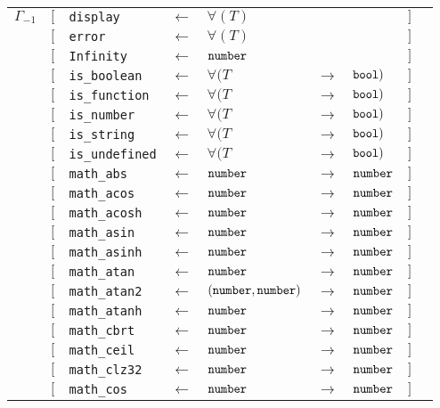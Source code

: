 \begin{tabular}[fragile]{lllllllll}
$\Gamma_{-1}$
& $[$ & \texttt{display}      & $\leftarrow$  & $\forall(T)$ & & & $]$ \\
& $[$ & \texttt{error}      & $\leftarrow$  & $\forall(T)$ & & & $]$ \\
& $[$ & \texttt{Infinity}      & $\leftarrow$  & $\texttt{number}$ & & & $]$ \\
& $[$ & \texttt{is\_boolean}      & $\leftarrow$  & $\forall(T$ & $\rightarrow$ & $\texttt{bool})$ & $]$ \\
& $[$ & \texttt{is\_function} & $\leftarrow$  & $\forall(T$ & $\rightarrow$ & $\texttt{bool})$ & $]$ \\
& $[$ & \texttt{is\_number} & $\leftarrow$  & $\forall(T$ & $\rightarrow$ & $\texttt{bool})$ & $]$ \\
& $[$ & \texttt{is\_string} & $\leftarrow$  & $\forall(T$ & $\rightarrow$ & $\texttt{bool})$ & $]$ \\
& $[$ & \texttt{is\_undefined} & $\leftarrow$  & $\forall(T$ & $\rightarrow$ & $\texttt{bool})$ & $]$ \\
& $[$ & \texttt{math\_abs} & $\leftarrow$  & $\texttt{number}$ & $\rightarrow$ & $\texttt{number}$ & $]$ \\
& $[$ & \texttt{math\_acos} & $\leftarrow$  & $\texttt{number}$ & $\rightarrow$ & $\texttt{number}$ & $]$ \\
& $[$ & \texttt{math\_acosh} & $\leftarrow$  & $\texttt{number}$ & $\rightarrow$ & $\texttt{number}$ & $]$ \\
& $[$ & \texttt{math\_asin} & $\leftarrow$  & $\texttt{number}$ & $\rightarrow$ & $\texttt{number}$ & $]$ \\
& $[$ & \texttt{math\_asinh} & $\leftarrow$  & $\texttt{number}$ & $\rightarrow$ & $\texttt{number}$ & $]$ \\
& $[$ & \texttt{math\_atan} & $\leftarrow$  & $\texttt{number}$ & $\rightarrow$ & $\texttt{number}$ & $]$ \\
& $[$ & \texttt{math\_atan2} & $\leftarrow$  & $(\texttt{number}, \texttt{number})$ & $\rightarrow$ & $\texttt{number}$ & $]$ \\
& $[$ & \texttt{math\_atanh} & $\leftarrow$  & $\texttt{number}$ & $\rightarrow$ & $\texttt{number}$ & $]$ \\
& $[$ & \texttt{math\_cbrt} & $\leftarrow$  & $\texttt{number}$ & $\rightarrow$ & $\texttt{number}$ & $]$ \\
& $[$ & \texttt{math\_ceil} & $\leftarrow$  & $\texttt{number}$ & $\rightarrow$ & $\texttt{number}$ & $]$ \\
& $[$ & \texttt{math\_clz32} & $\leftarrow$  & $\texttt{number}$ & $\rightarrow$ & $\texttt{number}$ & $]$ \\
& $[$ & \texttt{math\_cos} & $\leftarrow$  & $\texttt{number}$ & $\rightarrow$ & $\texttt{number}$ & $]$ \\

\end{tabular}
